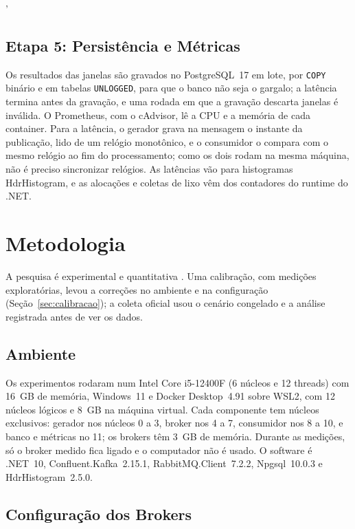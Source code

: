 '\documentclass[12pt]{article}
\begin{document}
\subsection{Etapa 5: Persistência e Métricas}
\label{sec:coleta}

Os resultados das janelas são gravados no PostgreSQL~17 em lote, por \texttt{COPY}
binário e em tabelas \texttt{UNLOGGED}, para que o banco não seja o gargalo; a latência
termina antes da gravação, e uma rodada em que a gravação descarta janelas é inválida. O
Prometheus, com o cAdvisor, lê a CPU e a memória de cada container. Para a latência, o
gerador grava na mensagem o instante da publicação, lido de um relógio monotônico, e o
consumidor o compara com o mesmo relógio ao fim do processamento; como os dois rodam na
mesma máquina, não é preciso sincronizar relógios. As latências vão para histogramas
HdrHistogram, e as alocações e coletas de lixo vêm dos contadores do runtime do .NET.


\section{Metodologia}
\label{sec:metodologia}

A pesquisa é experimental e quantitativa \cite{jain:1991}. Uma calibração, com medições
exploratórias, levou a correções no ambiente e na configuração
(Seção~\ref{sec:calibracao}); a coleta oficial usou o cenário congelado e a análise
registrada antes de ver os dados.

\subsection{Ambiente}

Os experimentos rodaram num Intel Core i5-12400F (6 núcleos e 12 threads) com 16~GB de
memória, Windows~11 e Docker Desktop~4.91 sobre WSL2, com 12 núcleos lógicos e 8~GB na
máquina virtual. Cada componente tem núcleos exclusivos: gerador nos núcleos 0 a 3, broker
nos 4 a 7, consumidor nos 8 a 10, e banco e métricas no 11; os brokers têm 3~GB de memória.
Durante as medições, só o broker medido fica ligado e o computador não é usado. O software
é .NET~10, Confluent.Kafka~2.15.1, RabbitMQ.Client~7.2.2, Npgsql~10.0.3 e
HdrHistogram~2.5.0.

\subsection{Configuração dos Brokers}
\label{sec:configuracao}
\end{document}
